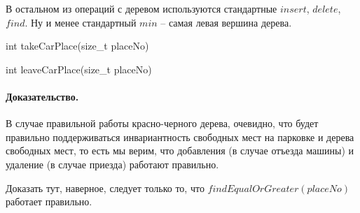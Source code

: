\documentclass[12pt]{article}
\begin{document}
В остальном из операций с деревом используются стандартные $ insert $,
$ delete $, $ find $. Ну и менее стандартный $ min $ -- самая левая
вершина дерева.

\begin{function}
    \caption{int takeCarPlace(size\_t placeNo)}
    \label{algo:duplicate2}
\end{function}

\begin{function}
    \dontprintsemicolon
    \caption{int leaveCarPlace(size\_t placeNo)}
    \label{algo:duplicate2}
\end{function}


\paragraph{Доказательство.}
В случае правильной работы красно-черного дерева, очевидно, что будет
правильно поддерживаться инвариантность свободных мест на парковке и
дерева свободных мест, то есть мы верим, что добавления (в случае отъезда
машины) и удаление (в случае приезда) работают правильно.

Доказать тут, наверное, следует только то, что $ findEqualOrGreater(placeNo) $
работает правильно.
\end{document}
